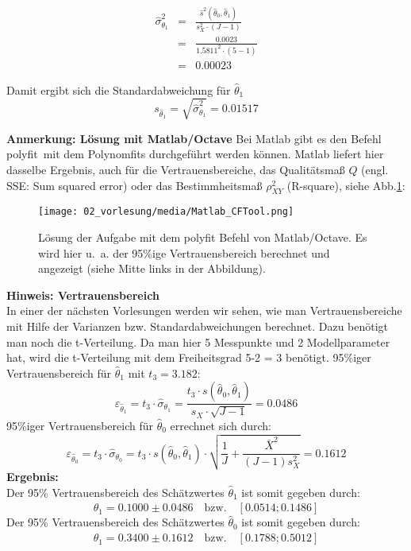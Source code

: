 \begin{eqnarray}
\hat\sigma^2_{\theta_1} &=& \frac{ \hat s^2(\hat{\theta}_0 ,\hat{\theta}_1 )}
{s^2_X \cdot (J- 1) }
\nonumber \\
&=& \frac{ 0.0023}
{1.5811^2 \cdot (5- 1) } \nonumber \\
&=& 0.00023
\end{eqnarray}

Damit ergibt sich die Standardabweichung für $\hat\theta_1$
\[
s_{\hat\theta_1} = \sqrt{\hat\sigma_{\theta_1}^2} = 0.01517
\]

\newpage
\textbf{Anmerkung: Lösung mit Matlab/Octave} 
Bei Matlab gibt es den Befehl \glqq polyfit\grqq ~mit dem Polynomfits durchgeführt werden können. Matlab liefert hier dasselbe Ergebnis, auch für die Vertrauensbereiche, das Qualitätsmaß $Q$ (engl. SSE: Sum squared error) oder das Bestimmheitsmaß $\rho^2_{XY}$ (R-square), siehe Abb.\ref{fig:MatlabPolyfit}:
\begin{figure}[!htp]
	\begin{center}
		\texttt{[image: 02\_vorlesung/media/Matlab\_CFTool.png]}
		\caption{Lösung der Aufgabe mit dem polyfit Befehl von Matlab/Octave. 
			Es wird hier u.~a. der 95\%ige Vertrauensbereich berechnet und
			angezeigt (siehe Mitte links in der Abbildung).}
		\label{fig:MatlabPolyfit}
	\end{center}
\end{figure}

\textbf{Hinweis: Vertrauensbereich} \\
In einer der nächsten Vorlesungen werden wir sehen, wie man Vertrauensbereiche 
mit Hilfe der Varianzen bzw. Standardabweichungen berechnet. Dazu benötigt man 
noch die t-Verteilung. Da man hier 5 Messpunkte und 2 Modellparameter hat,
wird die t-Verteilung mit dem Freiheitsgrad 5-2 = 3 benötigt. 
95\%iger Vertrauensbereich für $\hat\theta_1$ mit $t_3 = 3.182$: 
\[
\varepsilon _{\hat{\theta}_1} = t_3 \cdot \hat\sigma_{\theta_1} = \frac{t_3 \cdot s(\hat{\theta}_0 ,
	\hat{\theta}_1 )}{s_X \cdot \sqrt {J
		- 1} } = 0.0486
\]
95\%iger Vertrauensbereich für $\hat\theta_0$ errechnet sich durch:
\[
\varepsilon _{\hat{\theta}_0} = t_3 \cdot \hat\sigma_{\theta_0} = t_3 \cdot s(\hat{\theta}_0 ,\hat{\theta}_1 ) \cdot \sqrt {\frac{1}{J} + \frac{\bar {X}^2}{(J - 1) s_X^2 }} = 0.1612
\]
\textbf{Ergebnis:} \\ 
Der 95\% Vertrauensbereich des Schätzwertes $\hat\theta_1$ ist somit gegeben durch:
\begin{equation}
\hat\theta_1 = 0.1000 \pm 0.0486 \quad \text{bzw.} \quad [0.0514;0.1486]
\end{equation}
Der 95\% Vertrauensbereich des Schätzwertes $\hat\theta_0$ ist somit gegeben durch: 
\begin{equation}
\hat\theta_1 = 0.3400 \pm 0.1612 \quad \text{bzw.} \quad [0.1788;0.5012]
\end{equation}


